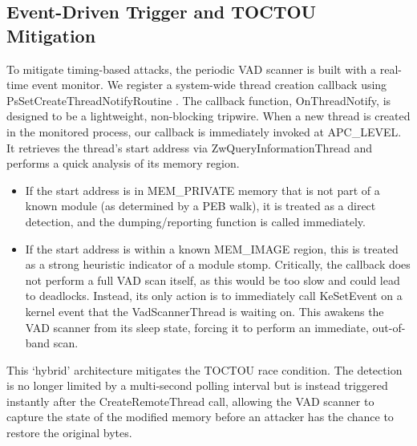 \documentclass[journal]{IEEEtran}
\begin{document}
\subsection{Event-Driven Trigger and TOCTOU Mitigation}
To mitigate timing-based attacks, the periodic VAD scanner is built with a real-time event monitor. We register a system-wide thread creation callback using PsSetCreateThreadNotifyRoutine \cite{microsoftPsSetCreateThreadNotify}. The callback function, OnThreadNotify, is designed to be a lightweight, non-blocking tripwire.
When a new thread is created in the monitored process, our callback is immediately invoked at APC\_LEVEL. It retrieves the thread's start address via ZwQueryInformationThread and performs a quick analysis of its memory region.
\begin{itemize}
\item If the start address is in MEM\_PRIVATE memory that is not part of a known module (as determined by a PEB walk), it is treated as a direct detection, and the dumping/reporting function is called immediately.
\item If the start address is within a known MEM\_IMAGE region, this is treated as a strong heuristic indicator of a module stomp. Critically, the callback does not perform a full VAD scan itself, as this would be too slow and could lead to deadlocks. Instead, its only action is to immediately call KeSetEvent on a kernel event that the VadScannerThread is waiting on. This awakens the VAD scanner from its sleep state, forcing it to perform an immediate, out-of-band scan.
\end{itemize}
This `hybrid' architecture mitigates the TOCTOU race condition. The detection is no longer limited by a multi-second polling interval but is instead triggered instantly after the CreateRemoteThread call, allowing the VAD scanner to capture the state of the modified memory before an attacker has the chance to restore the original bytes.
\end{document}
